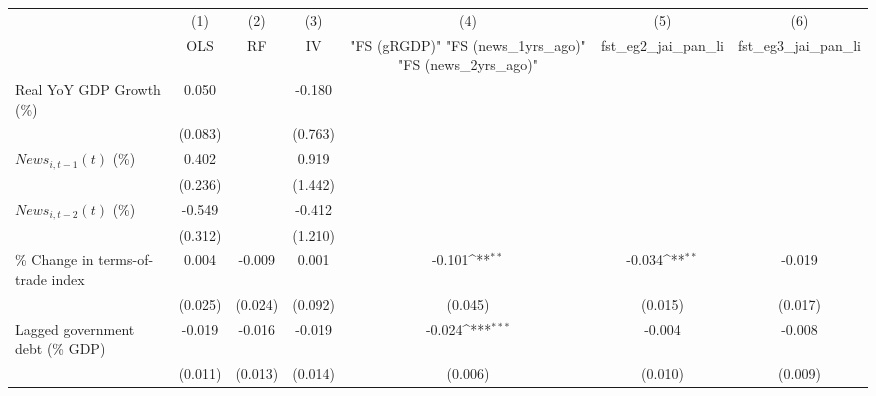 {
\def\sym#1{\ifmmode^{#1}\else\(^{#1}\)\fi}
\begin{tabular}{l*{6}{c}}
\toprule
                    &\multicolumn{1}{c}{(1)}&\multicolumn{1}{c}{(2)}&\multicolumn{1}{c}{(3)}&\multicolumn{1}{c}{(4)}&\multicolumn{1}{c}{(5)}&\multicolumn{1}{c}{(6)}\\
                    &\multicolumn{1}{c}{OLS}&\multicolumn{1}{c}{RF}&\multicolumn{1}{c}{IV}&\multicolumn{1}{c}{ "FS (gRGDP)"  "FS (news_1yrs_ago)"  "FS (news_2yrs_ago)" }&\multicolumn{1}{c}{fst_eg2_jai_pan_li}&\multicolumn{1}{c}{fst_eg3_jai_pan_li}\\
\midrule
Real YoY GDP Growth (\%)&       0.050         &                     &      -0.180         &                     &                     &                     \\
                    &     (0.083)         &                     &     (0.763)         &                     &                     &                     \\
\addlinespace
$ News_{i,t-1}(t)$ (\%)&       0.402         &                     &       0.919         &                     &                     &                     \\
                    &     (0.236)         &                     &     (1.442)         &                     &                     &                     \\
\addlinespace
$ News_{i,t-2}(t)$ (\%)&      -0.549         &                     &      -0.412         &                     &                     &                     \\
                    &     (0.312)         &                     &     (1.210)         &                     &                     &                     \\
\addlinespace
\% Change in terms-of-trade index&       0.004         &      -0.009         &       0.001         &      -0.101\sym{**} &      -0.034\sym{**} &      -0.019         \\
                    &     (0.025)         &     (0.024)         &     (0.092)         &     (0.045)         &     (0.015)         &     (0.017)         \\
\addlinespace
Lagged government debt (\% GDP)&      -0.019         &      -0.016         &      -0.019         &      -0.024\sym{***}&      -0.004         &      -0.008         \\
                    &     (0.011)         &     (0.013)         &     (0.014)         &     (0.006)         &     (0.010)         &     (0.009)         \\

\end{tabular}}
